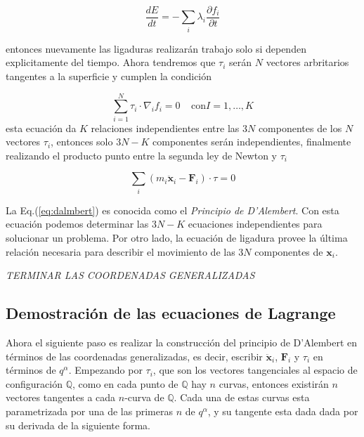     \begin{equation*}
        \frac{dE}{dt} = - \sum_i \lambda_i \frac{\partial f_i}{\partial t}
    \end{equation*}

    entonces nuevamente las ligaduras realizarán trabajo solo si dependen explicitamente del tiempo. Ahora tendremos que $\tau_i$  serán $N$ vectores arbritarios tangentes a la superficie y cumplen la condición

    \begin{equation*}
        \sum_{i = 1}^{N}\tau_i \cdot \nabla_i f_i = 0 \;\;\;\; \text{con} I = 1, \dots, K 
    \end{equation*}
    esta ecuación da $K$ relaciones independientes entre las $3N$ componentes de los $N$ vectores $\tau_i$, entonces solo $3N - K$ componentes serán independientes, finalmente realizando el producto punto entre la segunda ley de Newton y $\tau_i$

    \begin{equation}
        \sum_i (m_i\ddot{\mathbf{x}}_i - \mathbf{F}_i) \cdot \tau = 0
        \label{eq:dalmbert}
    \end{equation}

    La Eq.(\ref*{eq:dalmbert}) es conocida como el \textit{Principio de D'Alembert}. Con esta ecuación podemos determinar las $3N-K$ ecuaciones independientes para solucionar un problema. Por otro lado, la ecuación de ligadura provee la última relación necesaria para describir el movimiento de las $3N$ componentes de $\mathbf{x}_i$.

    \textit{TERMINAR LAS COORDENADAS GENERALIZADAS}
    
\subsection[short]{Demostración de las ecuaciones de Lagrange}


    Ahora el siguiente paso es realizar la construcción del principio de D'Alembert en términos de las coordenadas generalizadas, es decir, escribir $\mathbf{\ddot{x}}_i$, $\mathbf{F}_i$ y $\tau_i$ en términos de $q^{\alpha}$. Empezando por $\tau_i$, que son los vectores tangenciales al espacio de configuración $\mathbb{Q}$, como en cada punto de $\mathbb{Q}$ hay $n$ curvas, entonces existirán $n$ vectores tangentes a cada $n$-curva de $\mathbb{Q}$. Cada una de estas curvas esta parametrizada por una de las primeras $n$ de $q^{\alpha}$, y su tangente esta dada dada por su derivada de la siguiente forma. 

